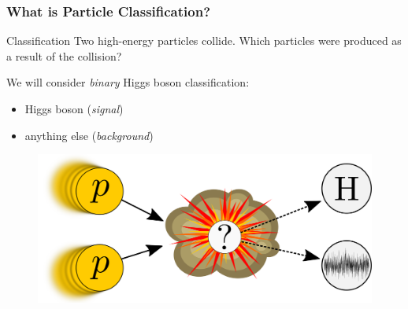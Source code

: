 \documentclass[14pt, t]{beamer}
\begin{document}
\begin{frame}
    \frametitle{What is Particle Classification?}

    \begin{block}{Classification}
        Two high-energy particles collide. Which particles were produced as a result of the collision?
    \end{block}

    \pause
    \vspace{2mm}
    We will consider \textit{binary} Higgs boson classification: \\
    \begin{itemize}
    
        \item Higgs boson (\textit{signal})

        \item anything else (\textit{background})
    
    \end{itemize}
    \vspace{-5mm}
    \begin{figure}
        \centering
        \includegraphics[width=0.65\linewidth]{vector/figures-presentation/classification.png}
    \end{figure}
\end{frame}
\end{document}
